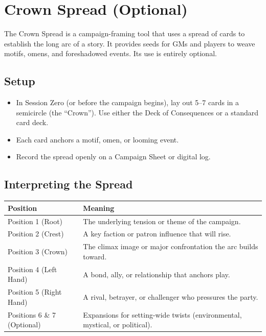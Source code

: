 
\section{Crown Spread (Optional)}

The Crown Spread is a campaign-framing tool that uses a spread of cards to establish the long arc of a story. It provides seeds for GMs and players to weave motifs, omens, and foreshadowed events. Its use is entirely optional.

\subsection{Setup}

\begin{itemize}
  \item In Session Zero (or before the campaign begins), lay out 5–7 cards in a semicircle (the ``Crown''). Use either the Deck of Consequences or a standard card deck.
  \item Each card anchors a motif, omen, or looming event.
  \item Record the spread openly on a Campaign Sheet or digital log.
\end{itemize}

\subsection{Interpreting the Spread}

\begin{tabular}{@{}lp{10cm}@{}}
\toprule
\textbf{Position} & \textbf{Meaning} \\
\midrule
Position 1 (Root) & The underlying tension or theme of the campaign. \\
Position 2 (Crest) & A key faction or patron influence that will rise. \\
Position 3 (Crown) & The climax image or major confrontation the arc builds toward. \\
Position 4 (Left Hand) & A bond, ally, or relationship that anchors play. \\
Position 5 (Right Hand) & A rival, betrayer, or challenger who pressures the party. \\
Positions 6 \& 7 (Optional) & Expansions for setting-wide twists (environmental, mystical, or political). \\
\bottomrule
\end{tabular}

